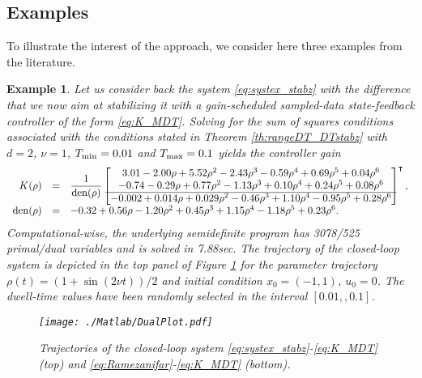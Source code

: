 \documentclass[12pt]{article}
\def\Tmin{T_{\textnormal{min}}}
\def\Tmax{T_{\textnormal{max}}}
\def\T{\textnormal{T}}
\newtheorem{example}[theorem]{Example}
\def\T{\intercal}
\begin{document}
\subsection{Examples}

To illustrate the interest of the approach, we consider here three examples from the literature.

\begin{example}
  Let us consider back the system \eqref{eq:systex_stabz} with the difference that we now aim at stabilizing it with a gain-scheduled sampled-data state-feedback controller of the form \eqref{eq:K_MDT}. Solving for the sum of squares conditions associated with the conditions stated in Theorem \ref{th:rangeDT_DTstabz} with $d=2$, $\nu=1$, $\Tmin=0.01$ and $\Tmax=0.1$ yields the controller gain
  \begin{equation}\label{eq:controllldlsdsdlsd}
\begin{array}{rcl}
  K(\rho)&=&\dfrac{1}{\textnormal{den}(\rho)}\begin{bmatrix}
     3.01-2.00\rho+5.52\rho^2-2.43\rho^3-0.59\rho^4+0.69\rho^5+0.04\rho^6\\
    -0.74-0.29\rho+0.77\rho^2-1.13\rho^3+0.10\rho^4+0.24\rho^5+0.08\rho^6\\
    \hline
 -0.002+0.014\rho+0.029\rho^2-0.46\rho^3+1.10\rho^4-0.95\rho^5+0.28\rho^6
  \end{bmatrix}^{\T},\\
%
  \textnormal{den}(\rho)&=&-0.32+0.56\rho-1.20\rho^2+0.45\rho^3+1.15\rho^4-1.18\rho^5+0.23\rho^6.
\end{array}
\end{equation}
  Computational-wise, the underlying semidefinite program has 3078/525 primal/dual variables and is solved in 7.88sec. The trajectory of the closed-loop system is depicted in the top panel of Figure \ref{fig:MySystemCD} for the parameter trajectory $\rho(t)=(1+\sin(2\nu t))/2$ and initial condition $x_0=(-1,1)$, $u_0=0$. The dwell-time values have been randomly selected in the interval $[0.01,,0.1]$.
  \begin{figure}
    \centering
    \texttt{[image: ./Matlab/DualPlot.pdf]}
    \caption{Trajectories of the closed-loop system \eqref{eq:systex_stabz}-\eqref{eq:K_MDT} (top) and \eqref{eq:Ramezanifar}-\eqref{eq:K_MDT} (bottom).}\label{fig:MySystemCD}
  \end{figure}
\end{example}
\end{document}
